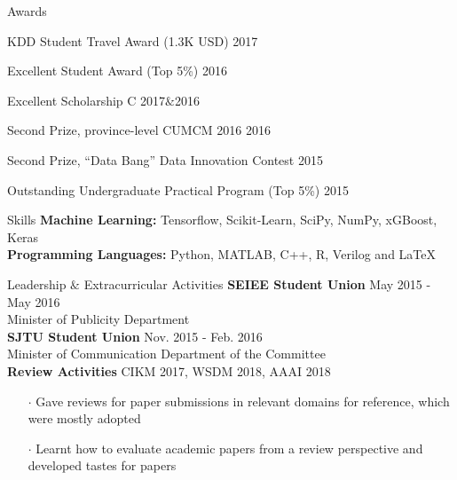 \documentclass{resume} %
\begin{document}

\begin{rSection}{Awards}
\begin{rSubsection}{}{}{}{}
\item KDD Student Travel Award (1.3K USD) \hfill{2017}
\item Excellent Student Award (Top 5\%)  \hfill{2016}
\item Excellent Scholarship C \hfill{2017$\&$2016}
\item Second Prize, province-level CUMCM 2016 \hfill{2016}
\item Second Prize, ``Data Bang'' Data Innovation Contest \hfill{2015} 
\item Outstanding Undergraduate Practical Program (Top 5\%) \hfill{2015}
\end{rSubsection}
\end{rSection}

\begin{rSection}{Skills}
{\bf Machine Learning: }
\hspace*{3.0 cm} Tensorflow, Scikit-Learn, SciPy, NumPy, xGBoost, Keras\\
{\bf Programming Languages: }
\hspace*{1.8 cm} Python, MATLAB, C++, R, Verilog and \LaTeX  \\
\end{rSection}
\begin{rSection}{Leadership $\&$ Extracurricular Activities}
\textbf{SEIEE Student Union} \hfill{May 2015 - May 2016}\\
Minister of Publicity Department  \\
\textbf{SJTU Student Union} \hfill{Nov. 2015 - Feb. 2016}\\
Minister of Communication Department of the Committee \\
\textbf{Review Activities} \hfill{CIKM 2017, WSDM 2018, AAAI 2018} 
\begin{itemize}
	\setlength\itemsep{-4.5 pt}
	\vspace{-4.5pt}
	\item [$\cdot$] Gave reviews for paper submissions in relevant domains for reference, which were mostly adopted
	\item [$\cdot$] Learnt how to evaluate academic papers from a review perspective and developed tastes for papers
\end{itemize}
\end{rSection}
\clearpage
\end{document}
